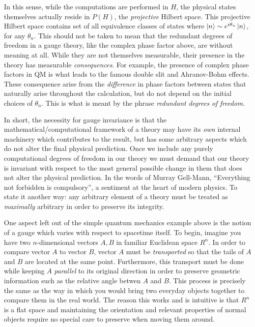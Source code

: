 In this sense, while the computations are performed in $H$, the physical states themselves actually reside in $P(H)$, the \textit{projective} Hilbert space.
This projective Hilbert space contains set of all equivalence classes of states where $\ket{n} \sim e^{i\theta_n}\ket{n}$, for any $\theta_n$.
This should not be taken to mean that the redundant degrees of freedom in a gauge theory, like the complex phase factor above, are without meaning at all. 
While they are not themselves measurable, their presence in the theory has measurable \textit{consequences}.
For example, the presence of complex phase factors in QM is what leads to the famous double slit and Ahranov-Bohm effects.
These consequence arise from the \textit{difference} in phase factors between states that naturally arise throughout the calculation, but do not depend on the initial choices of $\theta_n$. This is what is meant by the phrase \textit{redundant degrees of freedom}.

In short, the necessity for gauge invariance is that the mathematical/computational framework of a theory may have its \textit{own} internal machinery which contributes to the result, but has some arbitrary aspects which do not alter the final physical prediction.
Once we include any purely computational degrees of freedom in our theory we must demand that our theory is invariant with respect to the most general possible change in them that does not alter the physical prediction.
In the words of Murray Gell-Mann, ``Everything not forbidden is compulsory'', a sentiment at the heart of modern physics.
To state it another way: any arbitrary element of a theory must be treated as \textit{maximally} arbitrary in order to preserve its integrity.

One aspect left out of the simple quantum mechanics example above is the notion of a gauge which varies with respect to spacetime itself.
To begin, imagine you have two $n$-dimensional vectors $A,B$ in familiar Euclidean space $R^n$. In order to compare vector $A$ to vector $B$, vector $A$ must be \textit{transported} so that the tails of $A$ and $B$ are located at the same point.
Furthermore, this transport must be done while keeping $A$ \textit{parallel} to its original direction in order to preserve geometric information such as the relative angle betwen $A$ and $B$.
This process is precisely the same as the way in which you would bring two everyday objects together to compare them in the real world.
The reason this works and is intuitive is that $R^n$ is a flat space and maintaining the orientation and relevant properties of normal objects require no special care to preserve when moving them around.

